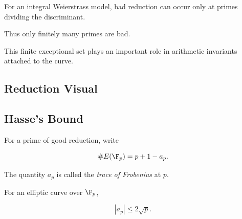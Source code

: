 For an integral Weierstrass model, bad reduction can occur only at primes
dividing the discriminant.

Thus only finitely many primes are bad.

This finite exceptional set plays an important role in arithmetic invariants
attached to the curve.

\subsection{Reduction Visual}
\label{subsec:reduction-visual}

\begin{centereddiagram}
\end{centereddiagram}

\subsection{Hasse's Bound}
\label{subsec:hasse-bound-arithmetic-geometry}

For a prime of good reduction, write

\[ \#E(\F_p)=p+1-a_p. \]

The quantity \(a_p\) is called the \emph{trace of Frobenius} at \(p\).

\begin{theorem}[Hasse]
For an elliptic curve over \(\F_p\),

\[ \boxed{|a_p|\leq2\sqrt p.} \]
\end{theorem}

